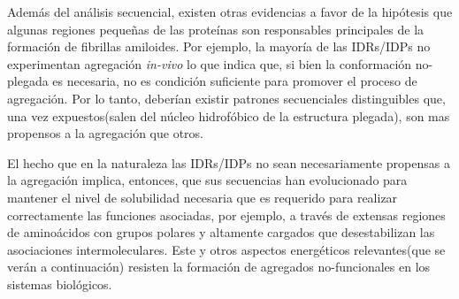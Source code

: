 Además del análisis secuencial, existen otras evidencias a favor de la hipótesis que algunas regiones pequeñas de las proteínas son responsables principales de la formación de fibrillas amiloides. 
Por ejemplo, la mayoría de las IDRs/IDPs no experimentan agregación \textit{in-vivo}\cite{linding2004comparative} lo que indica que, si bien la conformación no-plegada es necesaria, no es condición suficiente 
para promover el proceso de agregación.
Por lo tanto, deberían existir patrones secuenciales distinguibles que, una vez expuestos(salen del núcleo hidrofóbico de la estructura plegada), son mas propensos a la agregación que otros.  


% 

El hecho que en la naturaleza las IDRs/IDPs no sean necesariamente propensas a la agregación implica, entonces, que sus secuencias han evolucionado para mantener el nivel de solubilidad necesaria que es requerido para 
realizar correctamente las funciones asociadas, por ejemplo, a través de extensas regiones de aminoácidos con grupos polares y altamente cargados que desestabilizan las asociaciones intermoleculares.
Este y otros aspectos energéticos relevantes(que se verán a continuación) resisten la formación de agregados no-funcionales en los sistemas biológicos.  

